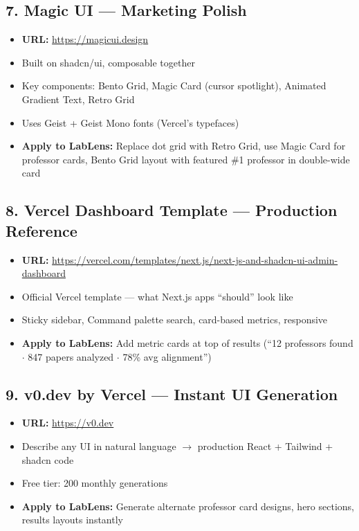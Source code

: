 \documentclass[11pt,letterpaper]{article}
\begin{document}
\subsection{7. Magic UI --- Marketing Polish}
\begin{itemize}[nosep]
    \item \textbf{URL:} \url{https://magicui.design}
    \item Built on shadcn/ui, composable together
    \item Key components: Bento Grid, Magic Card (cursor spotlight), Animated Gradient Text, Retro Grid
    \item Uses Geist + Geist Mono fonts (Vercel's typefaces)
    \item \textbf{Apply to LabLens:} Replace dot grid with Retro Grid, use Magic Card for professor cards, Bento Grid layout with featured \#1 professor in double-wide card
\end{itemize}

\subsection{8. Vercel Dashboard Template --- Production Reference}
\begin{itemize}[nosep]
    \item \textbf{URL:} \url{https://vercel.com/templates/next.js/next-js-and-shadcn-ui-admin-dashboard}
    \item Official Vercel template --- what Next.js apps ``should'' look like
    \item Sticky sidebar, Command palette search, card-based metrics, responsive
    \item \textbf{Apply to LabLens:} Add metric cards at top of results (``12 professors found $\cdot$ 847 papers analyzed $\cdot$ 78\% avg alignment'')
\end{itemize}

\subsection{9. v0.dev by Vercel --- Instant UI Generation}
\begin{itemize}[nosep]
    \item \textbf{URL:} \url{https://v0.dev}
    \item Describe any UI in natural language $\rightarrow$ production React + Tailwind + shadcn code
    \item Free tier: 200 monthly generations
    \item \textbf{Apply to LabLens:} Generate alternate professor card designs, hero sections, results layouts instantly
\end{itemize}
\end{document}

